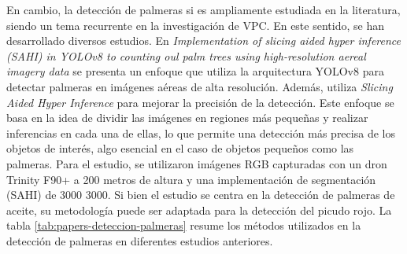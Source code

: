 
En cambio, la detección de palmeras si es ampliamente estudiada en la literatura, siendo un tema recurrente en la investigación de VPC. En este sentido, se han desarrollado diversos estudios. En \textit{Implementation of slicing aided hyper inference (SAHI) in YOLOv8 to counting oul palm trees using high-resolution aereal imagery data} \citep{zhorif_implementation_2024} se presenta un enfoque que utiliza la arquitectura YOLOv8 para detectar palmeras en imágenes aéreas de alta resolución. Además, utiliza \textit{Slicing Aided Hyper Inference} para mejorar la precisión de la detección. Este enfoque se basa en la idea de dividir las imágenes en regiones más pequeñas y realizar inferencias en cada una de ellas, lo que permite una detección más precisa de los objetos de interés, algo esencial en el caso de objetos pequeños como las palmeras. Para el estudio, se utilizaron imágenes RGB capturadas con un dron Trinity F90+ a 200 metros de altura y una implementación de segmentación (SAHI) de \SI{3000}{}\,\texttimes\,\SI{3000}{\pixel}. Si bien el estudio se centra en la detección de palmeras de aceite, su metodología puede ser adaptada para la detección del picudo rojo. La tabla \ref{tab:papers-deteccion-palmeras} resume los métodos utilizados en la detección de palmeras en diferentes estudios anteriores.

